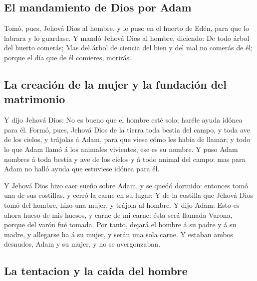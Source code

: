 \hypertarget{el-mandamiento-de-dios-por-adam}{%
\subsection{El mandamiento de Dios por
Adam}\label{el-mandamiento-de-dios-por-adam}}

 Tomó, pues, Jehová Dios al hombre, y le puso en el huerto
de Edén, para que lo labrara y lo guardase.  Y mandó Jehová
Dios al hombre, diciendo: De todo árbol del huerto comerás;
 Mas del árbol de ciencia del bien y del mal no comerás de
él; porque el día que de él comieres, morirás.

\hypertarget{la-creaciuxf3n-de-la-mujer-y-la-fundaciuxf3n-del-matrimonio}{%
\subsection{La creación de la mujer y la fundación del
matrimonio}\label{la-creaciuxf3n-de-la-mujer-y-la-fundaciuxf3n-del-matrimonio}}

 Y dijo Jehová Dios: No es bueno que el hombre esté solo;
haréle ayuda idónea para él.  Formó, pues, Jehová Dios de
la tierra toda bestia del campo, y toda ave de los cielos, y trájolas á
Adam, para que viese cómo les había de llamar; y todo lo que Adam llamó
á los animales vivientes, ese es su nombre.  Y puso Adam
nombres á toda bestia y ave de los cielos y á todo animal del campo: mas
para Adam no halló ayuda que estuviese idónea para él.

 Y Jehová Dios hizo caer sueño sobre Adam, y se quedó
dormido: entonces tomó una de sus costillas, y cerró la carne en su
lugar;  Y de la costilla que Jehová Dios tomó del hombre,
hizo una mujer, y trájola al hombre.  Y dijo Adam: Esto es
ahora hueso de mis huesos, y carne de mi carne: ésta será llamada
Varona, porque del varón fué tomada.  Por tanto, dejará el
hombre á su padre y á su madre, y allegarse ha á su mujer, y serán una
sola carne.  Y estaban ambos desnudos, Adam y su mujer, y
no se avergonzaban.

\hypertarget{la-tentacion-y-la-cauxedda-del-hombre}{%
\subsection{La tentacion y la caída del
hombre}\label{la-tentacion-y-la-cauxedda-del-hombre}}

